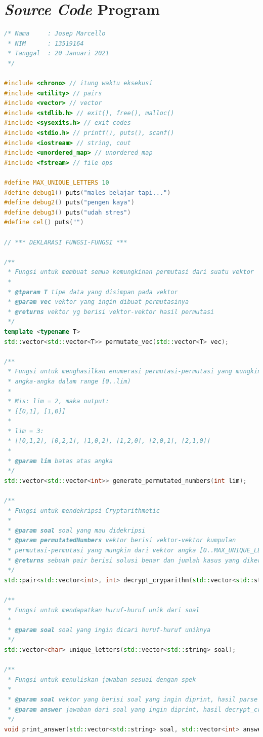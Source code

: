 \documentclass{article}
\begin{document}
\section{\textit{Source Code} Program}
\begin{lstlisting}[caption = main.cpp, language = c++]
/* Nama     : Josep Marcello
 * NIM      : 13519164
 * Tanggal  : 20 Januari 2021
 */

#include <chrono> // itung waktu eksekusi
#include <utility> // pairs
#include <vector> // vector
#include <stdlib.h> // exit(), free(), malloc()
#include <sysexits.h> // exit codes
#include <stdio.h> // printf(), puts(), scanf()
#include <iostream> // string, cout
#include <unordered_map> // unordered_map
#include <fstream> // file ops

#define MAX_UNIQUE_LETTERS 10
#define debug1() puts("males belajar tapi...")
#define debug2() puts("pengen kaya")
#define debug3() puts("udah stres")
#define cel() puts("")

// *** DEKLARASI FUNGSI-FUNGSI ***

/**
 * Fungsi untuk membuat semua kemungkinan permutasi dari suatu vektor
 *
 * @tparam T tipe data yang disimpan pada vektor
 * @param vec vektor yang ingin dibuat permutasinya
 * @returns vektor yg berisi vektor-vektor hasil permutasi
 */
template <typename T>
std::vector<std::vector<T>> permutate_vec(std::vector<T> vec);

/**
 * Fungsi untuk menghasilkan enumerasi permutasi-permutasi yang mungkin dari
 * angka-angka dalam range [0..lim)
 *
 * Mis: lim = 2, maka output:
 * [[0,1], [1,0]]
 *
 * lim = 3:
 * [[0,1,2], [0,2,1], [1,0,2], [1,2,0], [2,0,1], [2,1,0]]
 *
 * @param lim batas atas angka
 */
std::vector<std::vector<int>> generate_permutated_numbers(int lim);

/**
 * Fungsi untuk mendekripsi Cryptarithmetic
 *
 * @param soal soal yang mau didekripsi
 * @param permutatedNumbers vektor berisi vektor-vektor kumpulan
 * permutasi-permutasi yang mungkin dari vektor angka [0..MAX_UNIQUE_LETTERS]
 * @returns sebuah pair berisi solusi benar dan jumlah kasus yang dikerjakan
 */
std::pair<std::vector<int>, int> decrypt_cryparithm(std::vector<std::string> soal, std::vector<std::vector<int>> permutatedNumbers);

/**
 * Fungsi untuk mendapatkan huruf-huruf unik dari soal
 *
 * @param soal soal yang ingin dicari huruf-huruf uniknya
 */
std::vector<char> unique_letters(std::vector<std::string> soal);

/**
 * Fungsi untuk menuliskan jawaban sesuai dengan spek
 *
 * @param soal vektor yang berisi soal yang ingin diprint, hasil parse parse_file()
 * @param answer jawaban dari soal yang ingin diprint, hasil decrypt_cryparithm()
 */
void print_answer(std::vector<std::string> soal, std::vector<int> answer);


\end{lstlisting}
\end{document}

